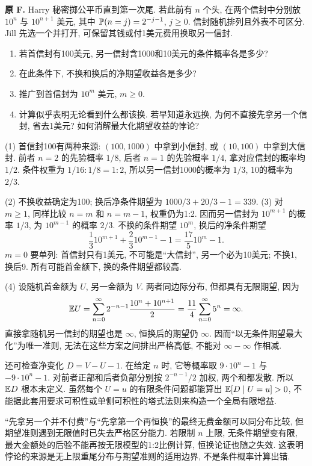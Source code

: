 \begin{exercise}\label{ex:P8.F}
\textbf{原 F.} Harry 秘密掷公平币直到第一次尾. 若此前有 $n$ 个头, 在两个信封中分别放 $10^n$ 与 $10^{n+1}$ 美元, 其中 $\mathbb P(n=j)=2^{-j-1}$, $j\ge0$. 信封随机排列且外表不可区分. Jill 先选一个并打开, 可保留其钱或付1美元费用换取另一信封.
\begin{enumerate}[label=\arabic*.]
\item\label{part:P8.F.1} 若首信封有100美元, 另一信封含1000和10美元的条件概率各是多少?
\item\label{part:P8.F.2} 在此条件下, 不换和换后的净期望收益各是多少?
\item\label{part:P8.F.3} 推广到首信封为 $10^m$ 美元, $m\ge0$.
\item\label{part:P8.F.4} 计算似乎表明无论看到什么都该换. 若早知道永远换, 为何不直接先拿另一个信封, 省去1美元? 如何消解最大化期望收益的悖论?
\end{enumerate}
\end{exercise}
\begin{solution}\label{sol:P8.F}
(1) 首信封100有两种来源: $(100,1000)$ 中拿到小信封, 或 $(10,100)$ 中拿到大信封. 前者 $n=2$ 的先验概率 $1/8$, 后者 $n=1$ 的先验概率 $1/4$, 拿对应信封的概率均 $1/2$. 条件权重为 $1/16:1/8=1:2$, 所以另一信封1000的概率为 $1/3$, 10的概率为 $2/3$.

(2) 不换收益确定为100; 换后净条件期望为 $1000/3+20/3-1=339$. (3) 对 $m\ge1$, 同样比较 $n=m$ 和 $n=m-1$, 权重仍为1:2. 因而另一信封为 $10^{m+1}$ 的概率 $1/3$, 为 $10^{m-1}$ 的概率 $2/3$. 不换的条件期望 $10^m$, 换后的净条件期望
\[
 \frac13 10^{m+1}+\frac23 10^{m-1}-1=\frac{17}{5}10^m-1.
\]
$m=0$ 要单列: 首信封只有1美元, 不可能是“大信封”, 另一个必为10美元; 不换1, 换后9. 所有可能首金额下, 换的条件期望都较高.

(4) 设随机首金额为 $U$, 另一金额为 $V$. 两者同边际分布, 但都具有无限期望, 因为
\[
 \mathbb E U=\sum_{n=0}^\infty 2^{-n-1}\frac{10^n+10^{n+1}}2
 =\frac{11}{4}\sum_{n=0}^\infty5^n=\infty.
\]
直接拿随机另一信封的期望也是 $\infty$, 恒换后的期望仍 $\infty$. 因而“以无条件期望最大化”为唯一准则, 无法在这些方案之间排出严格高低, 不能对 $\infty-\infty$ 作相减.

还可检查净变化 $D=V-U-1$. 在给定 $n$ 时, 它等概率取 $9\cdot10^n-1$ 与 $-9\cdot10^n-1$. 对前者正部和后者负部分别按 $2^{-n-1}/2$ 加权, 两个和都发散. 所以 $\mathbb E D$ 根本未定义. 虽然每个 $U=u$ 的有限条件问题都能算出 $\mathbb E[D\mid U=u]>0$, 不能据此套用要求可积性或单侧可积性的塔式法则来构造一个全局有限增益.

“先拿另一个并不付费”与“先拿第一个再恒换”的最终无费金额可以同分布比较, 但期望准则遇到无限值时已失去严格区分能力. 若限制 $n$ 上限, 无条件期望变有限, 最大金额处的后验不能再按无限模型的1:2比例计算, 恒换论证也随之失效. 这表明悖论的来源是无上限重尾分布与期望准则的适用边界, 不是条件概率计算出错.
\end{solution}

